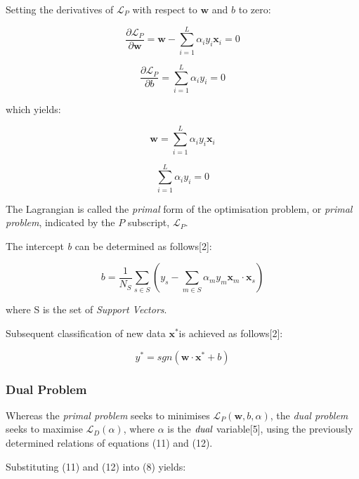 \documentclass[10pt, a4paper,reqno]{amsart}
\begin{document}
Setting the derivatives of $\mathcal{L}_P$ with respect to $\mathbf{w}$ and $b$ to zero:

\begin{equation}
\frac{\partial \mathcal{L}_P}{\partial \mathbf{w}} = \mathbf{w} -  \sum_{i=1}^{L}\alpha_i y_i \mathbf{x}_i = 0
\end{equation}
 
\begin{equation}
\frac{\partial \mathcal{L}_P}{\partial b} = \sum_{i=1}^{L}\alpha_i y_i = 0
\end{equation}

which yields:

\begin{equation}
\mathbf{w} = \sum_{i=1}^{L}\alpha_i y_i \mathbf{x}_i
\end{equation}

\begin{equation}
\sum_{i=1}^{L}\alpha_i y_i = 0
\end{equation}

The Lagrangian is called the \emph{primal} form of the optimisation problem, or \emph{primal problem}, indicated by the $P$ subscript, $\mathcal{L}_P$.

The intercept \emph{b} can be determined as follows[2]:

\begin{equation}
b = \frac{1}{N_S}\sum_{s\in S}(y_s - \sum_{m\in S}\alpha_m y_m \mathbf{x}_m\cdot\mathbf{x}_s)
\end{equation}

where S is the set of \emph{Support Vectors}.

Subsequent classification of new data $\mathbf{x}^*$is achieved as follows[2]:

\begin{equation}
y^* = sgn(\mathbf{w}\cdot\mathbf{x}^* + b)
\end{equation}


\subsubsection{Dual Problem}

Whereas the \emph{primal problem} seeks to minimises $\mathcal{L}_P(\mathbf{w}, b, \alpha)$, the \emph{dual problem} seeks to maximise $\mathcal{L}_D(\alpha)$, where $\alpha$ is the $\emph{dual}$ variable[5], using the previously determined relations of equations (11) and (12).

Substituting (11) and (12) into (8) yields:
\end{document}
